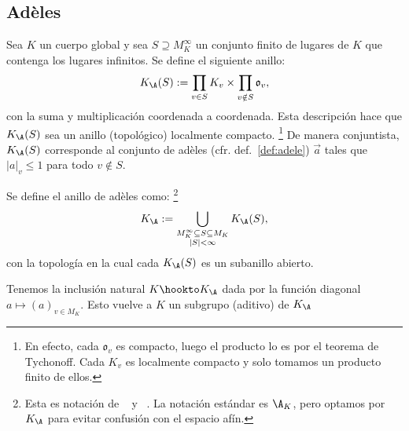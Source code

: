 \documentclass[teoria-numeros.tex]{subfiles}
\begin{document}
\subsection{Adèles}
\begin{mydef}
	Sea $K$ un cuerpo global y sea $S \supseteq M_K^\infty$ un conjunto finito de lugares de $K$ que contenga los lugares infinitos.
	Se define el siguiente anillo:
	$$ K_\A(S) := \prod_{v \in S} K_v \times \prod_{v \notin S} \mathfrak{o}_v, $$
	con la suma y multiplicación coordenada a coordenada.
	Esta descripción hace que $K_\A(S)$ sea un anillo (topológico) localmente compacto.%
	\footnote{En efecto, cada $\mathfrak{o}_v$ es compacto, luego el producto lo es por el teorema de Tychonoff.
	Cada $K_v$ es localmente compacto y solo tomamos un producto finito de ellos.}
	De manera conjuntista, $K_\A(S)$ corresponde al conjunto de adèles (cfr. def.~\ref{def:adele}) $\vec a$
	tales que $|a|_v \le 1$ para todo $v \notin S$.

	Se define el anillo de adèles como:%
	\footnote{Esta es notación de \citeauthor{weil:basic}~\cite[59]{weil:basic} y \citeauthor{bombieri:heights}~\cite[604]{bombieri:heights}.
	La notación estándar es $\A_K$, pero optamos por $K_\A$ para evitar confusión con el espacio afín.}
	$$ K_\A := \bigcup_{\substack{M_K^\infty \subseteq S \subseteq M_K \\ |S| < \infty}} K_\A(S), $$
	con la topología en la cual cada $K_\A(S)$ es un subanillo abierto.
\end{mydef}

Tenemos la inclusión natural $K \hookto K_\A$ dada por la función diagonal $a \mapsto (a)_{v \in M_K}$.
Esto vuelve a $K$ un subgrupo (aditivo) de $K_\A$
\end{document}
